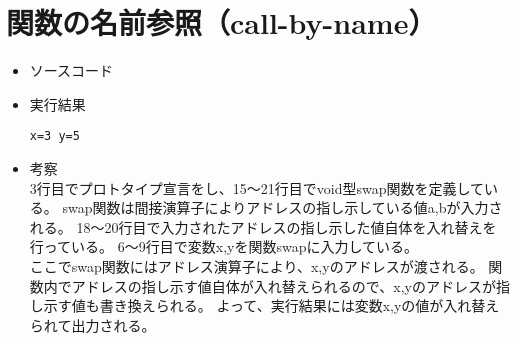\documentclass[a4paper]{jsarticle}
\begin{document}
\section{関数の名前参照（call-by-name）}
	\begin{itemize}
	\item ソースコード
		
		\mbox{}\newline
	\item 実行結果
		\begin{lstlisting}
x=3	y=5
		\end{lstlisting}
		\mbox{}\newline
	\item 考察\mbox{}\\
		3行目でプロトタイプ宣言をし、15〜21行目でvoid型swap関数を定義している。
		swap関数は間接演算子によりアドレスの指し示している値a,bが入力される。
		18〜20行目で入力されたアドレスの指し示した値自体を入れ替えを行っている。
		6〜9行目で変数x,yを関数swapに入力している。\\
		ここでswap関数にはアドレス演算子により、x,yのアドレスが渡される。
		関数内でアドレスの指し示す値自体が入れ替えられるので、x,yのアドレスが指し示す値も書き換えられる。
		よって、実行結果には変数x,yの値が入れ替えられて出力される。
	\end{itemize}
\end{document}
